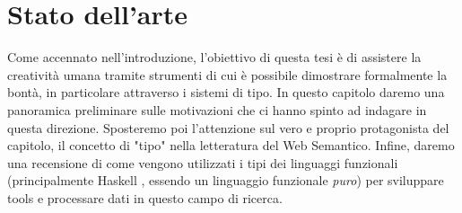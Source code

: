 \chapter[Stato dell'arte]{Stato dell'arte}
\label{chap:State-of-art}
Come accennato nell'introduzione, l'obiettivo di questa tesi è di assistere la creatività umana tramite strumenti di cui è possibile dimostrare formalmente la bontà, in particolare attraverso i sistemi di tipo. In questo capitolo daremo una panoramica preliminare sulle motivazioni che ci hanno spinto ad indagare in questa direzione. Sposteremo poi l'attenzione sul vero e proprio protagonista del capitolo, il concetto di "tipo" nella letteratura del Web Semantico. Infine, daremo una recensione di come vengono utilizzati i tipi dei linguaggi funzionali (principalmente Haskell \cite{o2008real}, essendo un linguaggio funzionale \textit{puro}) per sviluppare tools e processare dati in questo campo di ricerca.
\\
